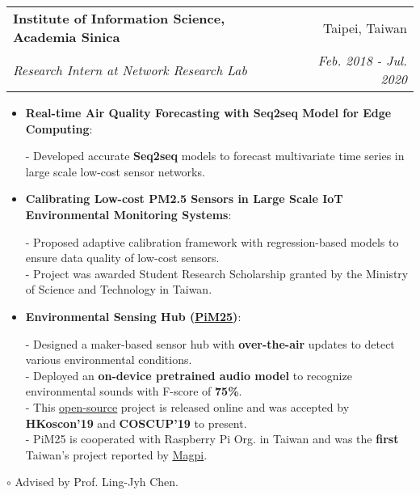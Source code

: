 \documentclass[letterpaper,11pt]{article}
\makeatletter
\newcommand{\resumeItem}[2]{
  \item\small{
    \textbf{#1}{: #2 \vspace{-2pt}}
  }
}
\newcommand{\resumeSubheading}[4]{
  \vspace{-2pt}\item
    \begin{tabular*}{0.97\textwidth}[t]{l@{\extracolsep{\fill}}r}
      \textbf{#1} & #2 \\
      \textit{\small #3} & \textit{\small #4} \\
    \end{tabular*}\vspace{-5pt}
}
\newcommand{\resumeItemListStart}{\begin{itemize}}
\newcommand{\resumeItemListEnd}{\end{itemize}\vspace{-5pt}}
\makeatother
\begin{document}
    \resumeSubheading
      {Institute of Information Science, Academia Sinica}{Taipei, Taiwan}
      {Research Intern at Network Research Lab}{Feb. 2018 - Jul. 2020}
      \resumeItemListStart
        \resumeItem{Real-time Air Quality Forecasting with Seq2seq Model for Edge Computing} \\
          {- Developed accurate \textbf{Seq2seq} models to forecast multivariate time series in large scale low-cost sensor networks.} \\
        \resumeItem{Calibrating Low-cost PM2.5 Sensors in Large Scale IoT Environmental Monitoring Systems} \\
          {- Proposed adaptive calibration framework with regression-based models to ensure data quality of low-cost sensors.} \\
          {- Project was awarded Student Research Scholarship granted by the Ministry of Science and Technology in Taiwan.} \\
        \resumeItem{Environmental Sensing Hub (\href{https://magpi.raspberrypi.org/articles/raspberry-pi-weather-project-taiwan}{\underline{PiM25}})} \\
          {- Designed a maker-based sensor hub with \textbf{over-the-air} updates to detect various environmental conditions.} \\
          {- Deployed an \textbf{on-device pretrained audio model} to recognize environmental sounds with F-score of \textbf{75\%}.} \\
          {- This \href{https://github.com/raspberrypi-tw/PiM25}{\underline{open-source}} project is released online and was accepted by \textbf{HKoscon'19} and \textbf{COSCUP'19} to present.} \\
          {- PiM25 is cooperated with Raspberry Pi Org. in Taiwan and was the \textbf{first} Taiwan's project reported by \href{https://magpi.raspberrypi.org/issues/77}{\underline{Magpi}}.}
      \resumeItemListEnd
      {$\circ$ Advised by Prof. Ling-Jyh Chen.}
 
\end{document}
